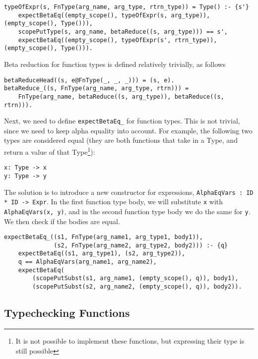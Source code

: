 \begin{lstlisting}
typeOfExpr(s, FnType(arg_name, arg_type, rtrn_type)) = Type() :- {s'}
    expectBetaEq((empty_scope(), typeOfExpr(s, arg_type)), (empty_scope(), Type())),
    scopePutType(s, arg_name, betaReduce((s, arg_type))) == s',
	expectBetaEq((empty_scope(), typeOfExpr(s', rtrn_type)), (empty_scope(), Type())).
\end{lstlisting}

Beta reduction for function types is defined relatively trivially, as follows

\begin{lstlisting}
betaReduceHead((s, e@FnType(_, _, _))) = (s, e).
betaReduce_((s, FnType(arg_name, arg_type, rtrn))) = 
	FnType(arg_name, betaReduce((s, arg_type)), betaReduce((s, rtrn))).
\end{lstlisting}

Next, we need to define \verb|expectBetaEq_| for function types. This is not trivial, since we need to keep alpha equality into account. For example, the following two types are considered equal (they are both functions that take in a Type, and return a value of that Type\footnote{It is not possible to implement these functions, but expressing their type is still possible}):

\begin{lstlisting}
x: Type -> x
y: Type -> y
\end{lstlisting}

The solution is to introduce a new constructor for expressions, \verb|AlphaEqVars : ID * ID -> Expr|. In the first function type body, we will substitute \verb|x| with \verb|AlphaEqVars(x, y)|, and in the second function type body we do the same for \verb|y|. We then check if the bodies are equal.

\begin{lstlisting}
expectBetaEq_((s1, FnType(arg_name1, arg_type1, body1)), 
              (s2, FnType(arg_name2, arg_type2, body2))) :- {q}
	expectBetaEq((s1, arg_type1), (s2, arg_type2)),
	q == AlphaEqVars(arg_name1, arg_name2),
	expectBetaEq(
		(scopePutSubst(s1, arg_name1, (empty_scope(), q)), body1), 
		(scopePutSubst(s2, arg_name2, (empty_scope(), q)), body2)).
\end{lstlisting}

\subsection{Typechecking Functions}




